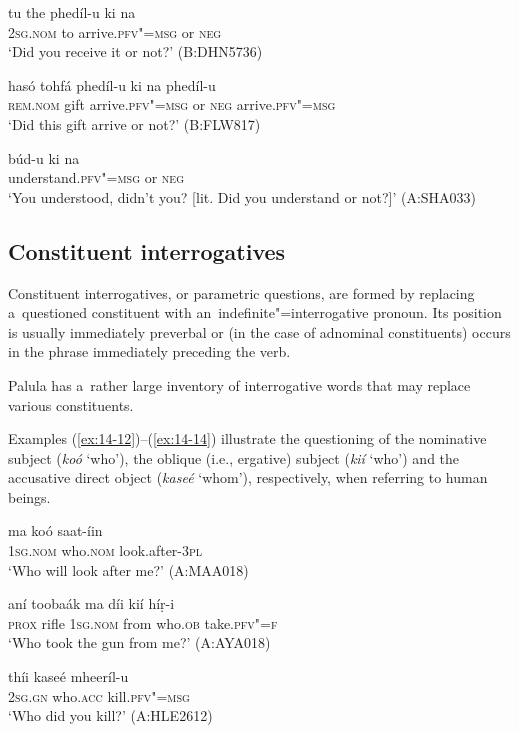 \begin{exe}
\ex
\label{ex:14-9}
\gll tu the phedíl-u ki na \\
\textsc{2sg.nom} to arrive.\textsc{pfv"=msg} or \textsc{neg} \\
\glt `Did you receive it or not?' (B:DHN5736)

\ex
\label{ex:14-10}
\gll hasó tohfá phedíl-u ki na phedíl-u  \\
\textsc{rem.nom} gift arrive.\textsc{pfv"=msg} or \textsc{neg}  arrive.\textsc{pfv"=msg} \\
\glt `Did this gift arrive or not?' (B:FLW817)

\ex
\label{ex:14-11}
\gll búd-u ki na \\
understand.\textsc{pfv"=msg} or \textsc{neg} \\
\glt `You understood, didn't you? [lit. Did you understand or not?]' (A:SHA033)
\end{exe}
\subsection{Constituent interrogatives}
\label{subsec:14-2-2}

Constituent interrogatives, or parametric questions, are formed by replacing a~questioned constituent with an~indefinite"=interrogative pronoun. Its position is usually immediately preverbal or (in the case of adnominal constituents) occurs in the phrase immediately preceding the verb.


Palula has a~rather large inventory of interrogative words that may replace various constituents.


 Examples (\ref{ex:14-12})--(\ref{ex:14-14}) illustrate the questioning of the nominative subject (\textit{koó} `who'), the oblique (i.e., ergative) subject (\textit{kií} `who') and the accusative direct object (\textit{kaseé} `whom'), respectively, when referring to human beings.

\begin{exe}
\ex
\label{ex:14-12}
\gll ma koó saat-íin \\
\textsc{1sg}.\textsc{nom} who.\textsc{nom} look.after-\textsc{3pl} \\
\glt `Who will look after me?' (A:MAA018)

\ex
\label{ex:14-13}
\gll aní toobaák ma díi kií híṛ-i\\
\textsc{prox} rifle \textsc{1sg.nom} from who.\textsc{ob} take.\textsc{pfv"=f} \\
\glt `Who took the gun from me?' (A:AYA018)

\ex
\label{ex:14-14}
\gll thíi kaseé mheeríl-u \\
\textsc{2sg.gn} who.\textsc{acc} kill.\textsc{pfv"=msg} \\
\glt `Who did you kill?' (A:HLE2612)
\end{exe}

